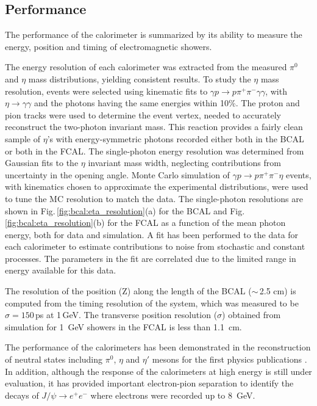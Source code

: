 \subsection{Performance \label{sec:calperformance}}
The performance of the calorimeter is summarized by its ability to measure the energy, position and timing of electromagnetic showers.

The energy resolution of each calorimeter was extracted from the measured $\pi^0$ and $\eta$ mass distributions, yielding consistent results. 
To study the $\eta$ mass resolution, events were selected using kinematic fits to $\gamma p \rightarrow p \pi^+ \pi^- \gamma \gamma$, with $\eta\rightarrow \gamma\gamma$ and the photons having the same energies within 10\%.
The proton and pion tracks were used to determine the event vertex, needed to accurately reconstruct the two-photon invariant mass.
This reaction provides a fairly clean sample of $\eta$'s with energy-symmetric photons recorded either both in the BCAL or both in the FCAL. 
The single-photon energy resolution was determined from Gaussian fits to the $\eta$ invariant mass width, neglecting contributions from uncertainty in the opening angle.
Monte Carlo simulation of $\gamma p \rightarrow p \pi^+ \pi^- \eta$ events, with kinematics chosen to approximate the experimental distributions, were used to tune the MC resolution to match the data. 
The single-photon resolutions are shown in Fig.\,\ref{fig:bcal:eta_resolution}(a) for the BCAL and Fig.\,\ref{fig:bcal:eta_resolution}(b) for the FCAL as a function of the mean photon energy, both for data and simulation.
A fit has been performed to the data for each calorimeter to estimate contributions to noise from stochastic and constant processes.  The parameters in the fit are correlated due to the limited range in energy available for this data.

The resolution of the position (Z) along the length of the BCAL ($\sim$\,2.5 cm) is computed from the timing resolution of the system, which was measured to be $\sigma=150$\,ps at 1\,GeV. The transverse position resolution ($\sigma$) obtained from simulation for 1~GeV showers in the FCAL is less than 1.1~cm.

The performance of the calorimeters has been demonstrated in the reconstruction of neutral states including $\pi^0$, $\eta$ and $\eta'$ mesons for the first \gx{} physics publications \cite{AlGhoul:2017nbp,Adhikari:2019gfa}. In addition, although the response of the calorimeters at high energy is still under evaluation, it has provided important electron-pion separation to identify the decays of $J/\psi\rightarrow e^+e^-$ \cite{Ali:2019lzf} where electrons were recorded up to 8~GeV. 

